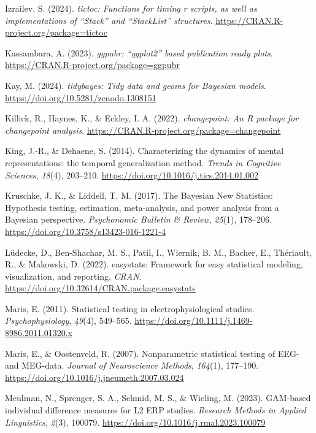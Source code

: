 \documentclass[
  doc,
  floatsintext,
  longtable,
  a4paper,
  nolmodern,
  notxfonts,
  notimes,
  colorlinks=true,linkcolor=blue,citecolor=blue,urlcolor=blue]{apa7}
\newlength{\cslhangindent}
\newenvironment{CSLReferences}[2] %
 {\begin{list}{}{%
  \setlength{\itemindent}{0pt}
  \setlength{\leftmargin}{0pt}
  \setlength{\parsep}{0pt}
  \ifodd #1
   \setlength{\leftmargin}{\cslhangindent}
   \setlength{\itemindent}{-1\cslhangindent}
  \fi
  \setlength{\itemsep}{#2\baselineskip}}}
 {\end{list}}
\begin{document}
\begin{CSLReferences}{1}{0}
Izrailev, S. (2024). \emph{{tictoc}: Functions for timing r scripts, as
well as implementations of {``{Stack}''} and {``{StackList}''}
structures}. \url{https://CRAN.R-project.org/package=tictoc}

Kassambara, A. (2023). \emph{{ggpubr}: {``{ggplot2}''} based publication
ready plots}. \url{https://CRAN.R-project.org/package=ggpubr}

Kay, M. (2024). \emph{{tidybayes}: Tidy data and geoms for {Bayesian}
models}. \url{https://doi.org/10.5281/zenodo.1308151}

Killick, R., Haynes, K., \& Eckley, I. A. (2022). \emph{{changepoint}:
An {R} package for changepoint analysis}.
\url{https://CRAN.R-project.org/package=changepoint}

King, J.-R., \& Dehaene, S. (2014). Characterizing the dynamics of
mental representations: the temporal generalization method. \emph{Trends
in Cognitive Sciences}, \emph{18}(4), 203--210.
\url{https://doi.org/10.1016/j.tics.2014.01.002}

Kruschke, J. K., \& Liddell, T. M. (2017). The Bayesian New Statistics:
Hypothesis testing, estimation, meta-analysis, and power analysis from a
Bayesian perspective. \emph{Psychonomic Bulletin \& Review},
\emph{25}(1), 178--206. \url{https://doi.org/10.3758/s13423-016-1221-4}

Lüdecke, D., Ben-Shachar, M. S., Patil, I., Wiernik, B. M., Bacher, E.,
Thériault, R., \& Makowski, D. (2022). {easystats}: Framework for easy
statistical modeling, visualization, and reporting. \emph{CRAN}.
\url{https://doi.org/10.32614/CRAN.package.easystats}

Maris, E. (2011). Statistical testing in electrophysiological studies.
\emph{Psychophysiology}, \emph{49}(4), 549--565.
\url{https://doi.org/10.1111/j.1469-8986.2011.01320.x}

Maris, E., \& Oostenveld, R. (2007). Nonparametric statistical testing
of EEG- and MEG-data. \emph{Journal of Neuroscience Methods},
\emph{164}(1), 177--190.
\url{https://doi.org/10.1016/j.jneumeth.2007.03.024}

Meulman, N., Sprenger, S. A., Schmid, M. S., \& Wieling, M. (2023).
GAM-based individual difference measures for L2 ERP studies.
\emph{Research Methods in Applied Linguistics}, \emph{2}(3), 100079.
\url{https://doi.org/10.1016/j.rmal.2023.100079}


\end{CSLReferences}
\end{document}
